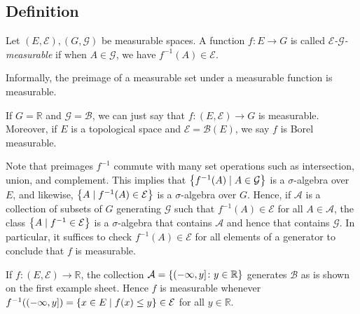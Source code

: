 \subsection{Definition}
\begin{definition}
	Let \( (E, \mathcal E), (G, \mathcal G) \) be measurable spaces.
	A function \( f \colon E \to G \) is called \emph{\( \mathcal E \)-\( \mathcal G \)-measurable} if when \( A \in \mathcal G \), we have \( f^{-1}(A) \in \mathcal E \).
\end{definition}
Informally, the preimage of a measurable set under a measurable function is measurable.

If \( G = \mathbb R \) and \( \mathcal G = \mathcal B \), we can just say that \( f \colon (E, \mathcal E) \to G \) is measurable.
Moreover, if \( E \) is a topological space and \( \mathcal E = \mathcal B(E) \), we say \( f \) is Borel measurable.

Note that preimages \( f^{-1} \) commute with many set operations such as intersection, union, and complement.
This implies that \( \qty{f^{-1}(A) \mid A \in \mathcal G} \) is a \( \sigma \)-algebra over \( E \), and likewise, \( \qty{A \mid f^{-1}(A) \in \mathcal E} \) is a \( \sigma \)-algebra over \( G \).
Hence, if \( \mathcal A \) is a collection of subsets of \( G \) generating \( \mathcal G \) such that \( f^{-1}(A) \in \mathcal E \) for all \( A \in \mathcal A \), the class \( \qty{A \mid f^{-1} \in \mathcal E} \) is a \( \sigma \)-algebra that contains \( \mathcal A \) and hence that contains \( \mathcal G \).
In particular, it suffices to check \( f^{-1}(A) \in \mathcal E \) for all elements of a generator to conclude that \( f \) is measurable.

If \( f \colon (E, \mathcal E) \to \mathbb R \), the collection \( \mathcal A = \qty{(-\infty,y] \colon y \in \mathbb R} \) generates \( \mathcal B \) as is shown on the first example sheet.
Hence \( f \) is measurable whenever \( f^{-1}((-\infty,y]) = \qty{x \in E \mid f(x) \leq y} \in \mathcal E \) for all \( y \in \mathbb R \).

